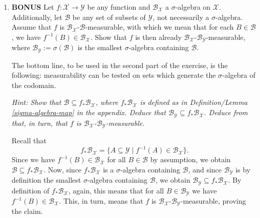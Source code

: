 \begin{enumerate}
\item \label{generating-sets}\textbf{BONUS}
Let $f: \mathcal{X} \to \mathcal{Y}$ be any function and $\mathcal{B}_{\mathcal{X}}$ a $\sigma$-algebra on $\mathcal{X}$.
Additionally, let $\mathcal{B}$ be any set of subsets of $\mathcal{Y}$, not necessarily a $\sigma$-algebra.
Assume that $f$ is $\mathcal{B}_{\mathcal{X}}$-$\mathcal{B}$-measurable, with which we mean that for each $B \in \mathcal{B}$, we have $f^{-1}(B) \in \mathcal{B}_{\mathcal{X}}$.
Show that $f$ is then already $\mathcal{B}_\mathcal{X}$-$\mathcal{B}_{\mathcal{Y}}$-measurable, where $\mathcal{B}_{\mathcal{Y}} := \sigma{(\mathcal{B})}$ is the smallest $\sigma$-algebra containing $\mathcal{B}$.

The bottom line, to be used in the second part of the exercise, is the following: measurability can be tested on sets which generate the $\sigma$-algebra of the codomain.

\emph{Hint: Show that $\mathcal{B} \subseteq f_*\mathcal{B}_{\mathcal{X}}$, where $f_*\mathcal{B}_{\mathcal{X}}$ is defined as in Definition/Lemma \ref*{sigma-algebra-map} in the appendix.
Deduce that $\mathcal{B}_{\mathcal{Y}} \subseteq f_* \mathcal{B}_{\mathcal{X}}$.
Deduce from that, in turn, that $f$ is $\mathcal{B}_{\mathcal{X}}$-$\mathcal{B}_{\mathcal{Y}}$-measurable.}

\begin{gradedsolution}
  Recall that
  \begin{equation*}
    f_* \mathcal{B}_{\mathcal{X}} = \{A \subseteq \mathcal{Y} \mid f^{-1}(A) \in \mathcal{B}_{\mathcal{X}}\}.
    \label{eq:recall_definition}
  \end{equation*}
  Since we have $f^{-1}(B) \in \mathcal{B}_{\mathcal{X}}$ for all $B \in \mathcal{B}$ by assumption, we obtain $\mathcal{B} \subseteq f_* \mathcal{B}_{\mathcal{X}}$.
  Now, since $f_* \mathcal{B}_{\mathcal{X}}$ is a $\sigma$-algebra containing $\mathcal{B}$, and since $\mathcal{B}_{\mathcal{Y}}$ is by definition the smallest $\sigma$-algebra containing $\mathcal{B}$, we obtain $\mathcal{B}_{\mathcal{Y}} \subseteq f_* \mathcal{B}_{\mathcal{X}}$.
  By definition of $f_* \mathcal{B}_{\mathcal{X}}$, again, this means that for all $B \in \mathcal{B}_{\mathcal{Y}}$ we have $f^{-1}(B) \in \mathcal{B}_{\mathcal{X}}$.
  This, in turn, means that $f$ is $\mathcal{B}_{\mathcal{X}}$-$\mathcal{B}_{\mathcal{Y}}$-measurable, proving the claim.
\end{gradedsolution}


\end{enumerate}
